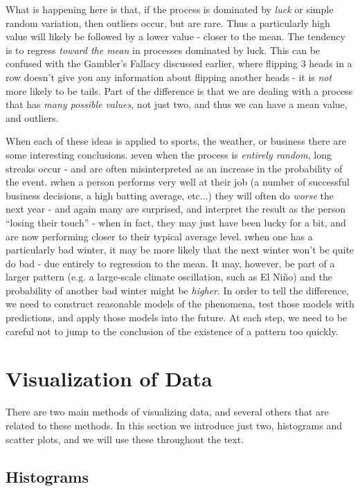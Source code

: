 What is happening here is that, if the process is dominated by {\em luck} or simple random variation, then outliers occur, but are rare.  Thus a particularly high value will likely be followed by a lower value - closer to the mean.  The tendency is to regress {\em toward the mean} in processes dominated by luck.  This can be confused with the Gambler's Fallacy discussed earlier, where flipping 3 heads in a row doesn't give you any information about flipping another heads - it is {\em not} more likely to be tails.  Part of the difference is that we are dealing with a process that has {\em many possible values}, not just two, and thus we can have a mean value, and outliers.  

When each of these ideas is applied to sports, the weather, or business there are some interesting conclusions.
\be
\i even when the process is {\em entirely random}, long streaks occur - and are often misinterpreted as an increase in the probability of the event.
\i when a person performs very well at their job (a number of successful business decisions, a high batting average, etc...) they will often do {\em worse} the next year - and again many are surprised, and interpret the result as the person ``losing their touch'' - when in fact, they may just have been lucky for a bit, and are now performing closer to their typical average level.
\i when one has a particularly bad winter, it may be more likely that the next winter won't be quite do bad - due entirely to regression to the mean.  It may, however, be part of a larger pattern (e.g. a large-scale climate oscillation, such as El Ni\~{n}o) and the probability of another bad winter might be \emph{higher}.  In order to tell the difference, we need to construct reasonable models of the phenomena, test those models with predictions, and apply those models into the future.  At each step, we need to be careful not to jump to the conclusion of the existence of a pattern too quickly.
\ee


\section{Visualization of Data}

There are two main methods of visualizing data, and several others that are related to these methods.  In this section we introduce just two, histograms and scatter plots, and we will use these throughout the text.

\subsection{Histograms}

